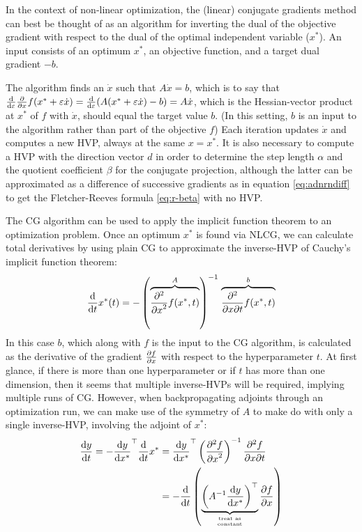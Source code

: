 \documentclass[11pt]{article}
\newcommand{\T}{\top}
\renewcommand{\(}{\left(}
\renewcommand{\)}{\right)}
\newcommand{\partby}[2]{{\partial #1\over \partial #2}}
\newcommand{\partbyby}[3]{{\partial^2 #1\over \partial #2 \partial #3}}
\newcommand{\partbyt}[2]{{\partial^2 #1\over {\partial #2}^2}}
\newcommand{\ud}{\mathrm{d}}
\newcommand{\dby}[2]{\frac{\ud #1}{\ud #2}}
\newcommand{\eps}{\varepsilon}
\begin{document}
In the context of non-linear optimization, the (linear) conjugate
gradients method can best be thought of as an algorithm for inverting
the dual of the objective gradient with respect to the dual of the
optimal independent variable ($x^*$). An input consists of an optimum
$x^*$, an objective function, and a target dual gradient $-b$.

\newcommand{\xdot}{\dot{x}}

The algorithm finds an $\xdot$ such that $A\xdot = b$, which is to say
that $\dby{}{\eps} \partby{}{x} f(x^* + \eps \xdot) =
\dby{}{\eps}(A(x^*+\eps \xdot)-b) = A\xdot$, which is the
Hessian-vector product at $x^*$ of $f$ with $\xdot$, should equal the
target value $b$. (In this setting, $b$ is an input to the algorithm
rather than part of the objective $f$) Each
iteration updates $\xdot$ and computes a new HVP, always at the same
$x=x^*$. It is also necessary to compute a HVP with the direction
vector $d$ in order to determine the step length $\alpha$ and the
quotient coefficient $\beta$ for the conjugate projection, although
the latter can be approximated as a difference of successive gradients
as in equation \ref{eq:adnrndiff} to get the Fletcher-Reeves formula
\ref{eq:r-beta} with no HVP.

The CG algorithm can be used to apply the implicit function theorem to
an optimization problem. Once an optimum $x^*$ is found via NLCG, we
can calculate total derivatives by using plain CG to approximate the
inverse-HVP of Cauchy's implicit function theorem:
\begin{align}
\dby{}{t}x^*(t) = -\left(\stackrel{A}{\overbrace{\partbyt{}{x}f(x^*,t)}}\right)^{-1} \stackrel{b}{\overbrace{\partbyby{}{x}{t}f(x^*,t)}}
\end{align}
In this case $b$, which along with $f$ is the input to the CG
algorithm, is calculated as the derivative of the gradient
$\partby{f}{x}$ with respect to the hyperparameter $t$. At first
glance, if there is more than one hyperparameter or if $t$ has more
than one dimension, then it seems that multiple inverse-HVPs will be
required, implying multiple runs of CG. However, when backpropagating
adjoints through an optimization run, we can make use of the symmetry
of $A$ to make do with only a single inverse-HVP, involving the
adjoint of $x^*$:
\begin{align}
  \dby{y}{t} = -\dby{y}{x^*}^\T \dby{}{t}x^* &= \dby{y}{x^*}^\T \left(\partbyt{f}{x} \right)^{-1} \partbyby{f}{x}{t} \\
  &= -\dby{}{t}\left(\underbrace{\left( A^{-1} \dby{y}{x^*} \right)^\T}_{{\textrm{\tiny treat as} \atop \textrm{\tiny constant}}}\partby{f}{x}\right)
\end{align}
\end{document}
